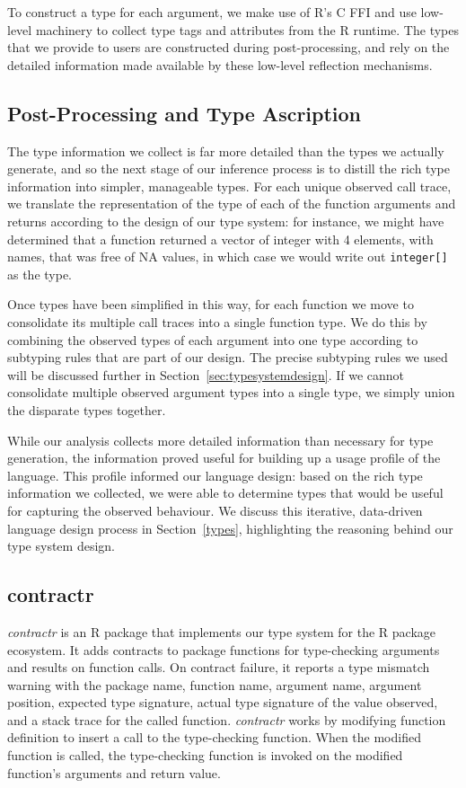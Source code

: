 \documentclass[acmsmall,review,anonymous]{acmart}\settopmatter{printfolios=true,printccs=false,printacmref=false}
\newcommand{\code}[1]{{\lstinline[style=Rin]!#1!}\xspace}
\newcommand{\contractr}{\emph{contractr}\xspace} %
\begin{document}
To construct a type for each argument, we make use of R's C FFI and use
low-level machinery to collect type tags and attributes from the R runtime.
The types that we provide to users are constructed during post-processing,
and rely on the detailed information made available by these low-level
reflection mechanisms.

%
%
%
%
\subsection{Post-Processing and Type Ascription}

The type information we collect is far more detailed than the types we
actually generate, and so the next stage of our inference process is to
distill the rich type information into simpler, manageable types.  For each
unique observed call trace, we translate the representation of the type of
each of the function arguments and returns according to the design of our
type system: for instance, we might have determined that a function returned
a vector of integer with 4 elements, with names, that was free of NA values,
in which case we would write out \code{integer[]} as the type.

Once types have been simplified in this way, for each function we move to
consolidate its multiple call traces into a single function type.  We do
this by combining the observed types of each argument into one type according to subtyping rules that are part of our
design.  The precise subtyping rules we used will be discussed further in
Section~\ref{sec:typesystemdesign}.
If we cannot consolidate multiple observed argument types into a single type, we simply union the disparate types together.

While our analysis collects more detailed information than necessary for type generation, the information proved useful for building up a usage profile of the language. 
This profile informed our language design: based on the rich type information we collected, we were able to determine types that would be useful for capturing the observed behaviour.
We discuss this iterative, data-driven language design process in Section~\ref{types}, highlighting the reasoning behind our type system design.

%
%
%
%
\subsection{contractr}
\label{sec:contractr}

\contractr is an R package that implements our type system for the R
package ecosystem. It adds contracts to package functions for type-checking
arguments and results on function calls. On contract failure, it reports a type
mismatch warning with the package name, function name, argument name, argument
position, expected type signature, actual type signature of the value observed,
and a stack trace for the called function. \contractr works by modifying
function definition to insert a call to the type-checking function. When the
modified function is called, the type-checking function is invoked on the
modified function's arguments and return value.
\end{document}
